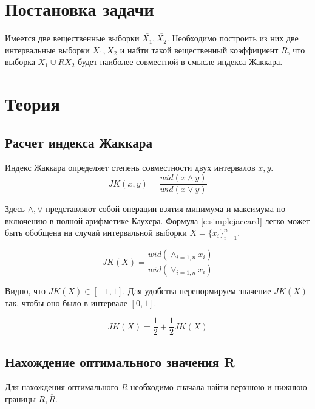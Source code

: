 \documentclass[a4paper,12pt]{article}
\begin{document}
    
    \newpage

    \tableofcontents
    \listoffigures
    \newpage

    \section{Постановка задачи}
    \quad Имеется две вещественные выборки $ \overline{X_{1}}, \overline{X_{2}} $.
    Необходимо построить из них две интервальные выборки $ X_{1}, X_{2} $
    и найти такой вещественный коэффициент $ R $, что выборка $ X_{1} \cup R X_{2} $
    будет наиболее совместной в смысле индекса Жаккара.

    \section{Теория}
    \subsection{Расчет индекса Жаккара}
    \quad Индекс Жаккара определяет степень совместности двух интервалов $ x, y $.
    \begin{equation}
        JK(x, y) = \frac{wid(x \land y)}{wid(x \lor y)}
        \label{e:simplejaccard}
    \end{equation}

    Здесь $ \land, \lor $ представляют собой операции взятия минимума и максимума по включению
    в полной арифметике Каухера.
    Формула \ref{e:simplejaccard} легко может быть обобщена на случай интервальной выборки $ X = \{x_i\}_{i=1}^{n} $.
    
    \begin{equation}
        JK(X) = \frac{wid(\land_{i=1,n}x_i)}{wid(\lor_{i=1,n}x_i)}
        \label{e:jaccard}
    \end{equation}

    Видно, что $ JK(X) \in [-1, 1] $. Для удобства перенормируем значение $ JK(X) $
    так, чтобы оно было в интервале $ [0, 1] $.

    \begin{equation}
        JK(X) = \frac{1}{2} + \frac{1}{2} JK(X)
    \end{equation}

    \subsection{Нахождение оптимального значения R}
    \quad Для нахождения оптимального $ R $ необходимо сначала найти верхнюю и нижнюю границы $ \underline{R}, \overline{R} $.
\end{document}
